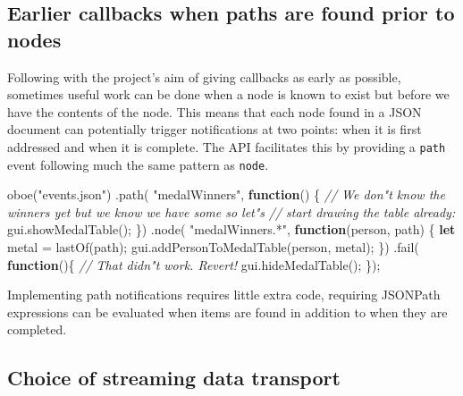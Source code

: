 \documentclass[]{article}
\newenvironment{Shaded}{}{}
\newcommand{\KeywordTok}[1]{\textcolor[rgb]{0.00,0.44,0.13}{\textbf{{#1}}}}
\newcommand{\StringTok}[1]{\textcolor[rgb]{0.25,0.44,0.63}{{#1}}}
\newcommand{\CommentTok}[1]{\textcolor[rgb]{0.38,0.63,0.69}{\textit{{#1}}}}
\newcommand{\OtherTok}[1]{\textcolor[rgb]{0.00,0.44,0.13}{{#1}}}
\newcommand{\FunctionTok}[1]{\textcolor[rgb]{0.02,0.16,0.49}{{#1}}}
\newcommand{\NormalTok}[1]{{#1}}
\begin{document}
\subsection{Earlier callbacks when paths are found prior to nodes}

Following with the project's aim of giving callbacks as early as
possible, sometimes useful work can be done when a node is known to
exist but before we have the contents of the node. This means that each
node found in a JSON document can potentially trigger notifications at
two points: when it is first addressed and when it is complete. The API
facilitates this by providing a \texttt{path} event following much the
same pattern as \texttt{node}.

\begin{Shaded}
\begin{Highlighting}[]
\FunctionTok{oboe}\NormalTok{(}\StringTok{"events.json"}\NormalTok{)}
   \NormalTok{.}\FunctionTok{path}\NormalTok{( }\StringTok{"medalWinners"}\NormalTok{, }\KeywordTok{function}\NormalTok{() \{}
      \CommentTok{// We don"t know the winners yet but we know we have some so let"s}
      \CommentTok{// start drawing the table already:    }
      \OtherTok{gui}\NormalTok{.}\FunctionTok{showMedalTable}\NormalTok{();}
   \NormalTok{\})}
   \NormalTok{.}\FunctionTok{node}\NormalTok{( }\StringTok{"medalWinners.*"}\NormalTok{, }\KeywordTok{function}\NormalTok{(person, path) \{    }
      \KeywordTok{let} \NormalTok{metal = }\FunctionTok{lastOf}\NormalTok{(path);}
      \OtherTok{gui}\NormalTok{.}\FunctionTok{addPersonToMedalTable}\NormalTok{(person, metal);}
   \NormalTok{\})}
   \NormalTok{.}\FunctionTok{fail}\NormalTok{( }\KeywordTok{function}\NormalTok{()\{}
      \CommentTok{// That didn"t work. Revert!}
      \OtherTok{gui}\NormalTok{.}\FunctionTok{hideMedalTable}\NormalTok{();}
   \NormalTok{\});}
\end{Highlighting}
\end{Shaded}

Implementing path notifications requires little extra code, requiring
JSONPath expressions can be evaluated when items are found in addition
to when they are completed.

\subsection{Choice of streaming data transport}
\end{document}
